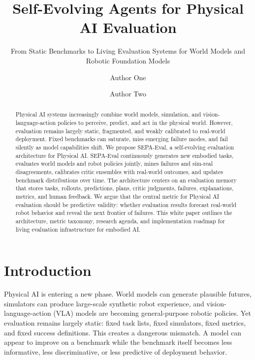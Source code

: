 \documentclass[sigconf,review,anonymous]{acmart}
\newcommand{\system}{SEPA-Eval\xspace}
\begin{document}
\title{Self-Evolving Agents for Physical AI Evaluation}
\subtitle{From Static Benchmarks to Living Evaluation Systems for World Models and Robotic Foundation Models}

\author{Author One}

\author{Author Two}

\begin{abstract}
Physical AI systems increasingly combine world models, simulation, and vision-language-action policies to perceive, predict, and act in the physical world. However, evaluation remains largely static, fragmented, and weakly calibrated to real-world deployment. Fixed benchmarks can saturate, miss emerging failure modes, and fail silently as model capabilities shift. We propose \system, a self-evolving evaluation architecture for Physical AI. \system continuously generates new embodied tasks, evaluates world models and robot policies jointly, mines failures and sim-real disagreements, calibrates critic ensembles with real-world outcomes, and updates benchmark distributions over time. The architecture centers on an evaluation memory that stores tasks, rollouts, predictions, plans, critic judgments, failures, explanations, metrics, and human feedback. We argue that the central metric for Physical AI evaluation should be predictive validity: whether evaluation results forecast real-world robot behavior and reveal the next frontier of failures. This white paper outlines the architecture, metric taxonomy, research agenda, and implementation roadmap for living evaluation infrastructure for embodied AI.
\end{abstract}

\maketitle

\section{Introduction}

Physical AI is entering a new phase. World models can generate plausible futures, simulators can produce large-scale synthetic robot experience, and vision-language-action (VLA) models are becoming general-purpose robotic policies. Yet evaluation remains largely static: fixed task lists, fixed simulators, fixed metrics, and fixed success definitions. This creates a dangerous mismatch. A model can appear to improve on a benchmark while the benchmark itself becomes less informative, less discriminative, or less predictive of deployment behavior.
\end{document}
